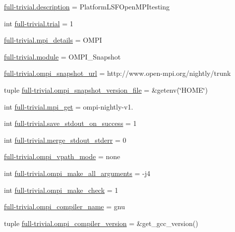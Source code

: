 \begin{DoxyCompactItemize}
\item 
\hyperlink{namespacefull-trivial_ad3a7f6605e8fa1721ffb53150f1b1f2b}{full-\/trivial.\-description} = Platform\-L\-S\-F\-Open\-M\-P\-Itesting
\item 
int \hyperlink{namespacefull-trivial_a431381ca4d3ce0533b84fdf824145c45}{full-\/trivial.\-trial} = 1
\item 
\hyperlink{namespacefull-trivial_ac8c1b563f56da3a28444d9ba8c6e9cc9}{full-\/trivial.\-mpi\-\_\-details} = O\-M\-P\-I
\item 
\hyperlink{namespacefull-trivial_ac8f46360931db54c90bacdbeb7de743d}{full-\/trivial.\-module} = O\-M\-P\-I\-\_\-\-Snapshot
\item 
\hyperlink{namespacefull-trivial_ad99b4206b0691dff98229634af7de89e}{full-\/trivial.\-ompi\-\_\-snapshot\-\_\-url} = http\-://www.\-open-\/mpi.\-org/nightly/trunk
\item 
tuple \hyperlink{namespacefull-trivial_a8cb0b5677b37b7bb5ee95a14399ff9a3}{full-\/trivial.\-ompi\-\_\-snapshot\-\_\-version\-\_\-file} = \&getenv(\char`\"{}H\-O\-M\-E\char`\"{})
\item 
int \hyperlink{namespacefull-trivial_a27abf09427482f97a0072b3be7e6601d}{full-\/trivial.\-mpi\-\_\-get} = ompi-\/nightly-\/v1.
\item 
int \hyperlink{namespacefull-trivial_aa9f5860b95aa3cfb3deaa3cf840b5615}{full-\/trivial.\-save\-\_\-stdout\-\_\-on\-\_\-success} = 1
\item 
int \hyperlink{namespacefull-trivial_abffbc48fc37ad6d7010976ca874c845f}{full-\/trivial.\-merge\-\_\-stdout\-\_\-stderr} = 0
\item 
\hyperlink{namespacefull-trivial_a58c9dd08bbe532a5face257efa5cbd3e}{full-\/trivial.\-ompi\-\_\-vpath\-\_\-mode} = none
\item 
int \hyperlink{namespacefull-trivial_a5a973d684d1c8c9442df7cd698a3cd03}{full-\/trivial.\-ompi\-\_\-make\-\_\-all\-\_\-arguments} = -\/j4
\item 
int \hyperlink{namespacefull-trivial_a84b104cbca5b5b6e7d726de01ad3947f}{full-\/trivial.\-ompi\-\_\-make\-\_\-check} = 1
\item 
\hyperlink{namespacefull-trivial_ab1eddfc5389978f354d58c7637810d41}{full-\/trivial.\-ompi\-\_\-compiler\-\_\-name} = gnu
\item 
tuple \hyperlink{namespacefull-trivial_ae61160048d266c12c817f0c990b0b41b}{full-\/trivial.\-ompi\-\_\-compiler\-\_\-version} = \&get\-\_\-gcc\-\_\-version()
\item 

\end{DoxyCompactItemize}
